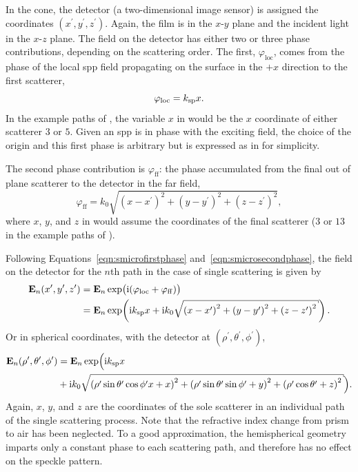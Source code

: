 In the cone, the detector (a two-dimensional image sensor) is assigned the
coordinates $(x^\prime,y^\prime,z^\prime)$.  Again, the film is in the
$x$-$y$ plane and the incident light in the $x$-$z$ plane.
The field on the detector has either two or three phase contributions,
depending on the scattering order. The first, $\varphi_\mathrm{loc}$, comes
from the phase of the local \gls{spp} field propagating on the surface in the
${+}x$ direction to the first scatterer,
\begin{equation}
  \varphi_\mathrm{loc} = k_\mathrm{sp} x.
  \label{eqn:smicrofirstphase}
\end{equation}
In the example paths of , the variable $x$ in
 would be the $x$
coordinate of either scatterer $3$ or $5$.  Given an \gls{spp} is in phase with the
exciting field, the choice of the origin and this first phase is arbitrary
but is expressed as in  for simplicity.

The second phase contribution is $\varphi_\mathrm{ff}$: the phase accumulated
from the final out of plane scatterer to the detector in the far field,
\begin{equation}
  \varphi_\mathrm{ff} =
  k_0\sqrt{{(x-x^\prime)}^2+{(y-y^\prime)}^2+{(z-z^\prime)}^2},
  \label{eqn:smicrosecondphase}
\end{equation}
where $x$, $y$, and $z$ in  would assume the coordinates of the final scatterer
($3$ or $13$ in the example paths of ).

Following Equations~\ref{eqn:smicrofirstphase} and~\ref{eqn:smicrosecondphase},
the field on the detector for the $n$th path in the case of single scattering is given by
\begin{align}
  \mathbf{E}_n(x^\prime,y^\prime,z^\prime) & =
  \mathbf{E}_n\exp\bigl(\mi(\varphi_\mathrm{loc}+\varphi_\mathrm{ff})\bigr)        \\
                                           & = \mathbf{E}_n\exp\!\left(\mi\ksp x + %
  \mi k_0\sqrt{{(x-x^\prime)}^2+{(y-y^\prime)}^2+{(z-z^\prime)}^2}\right).
  \label{eqn:smicrosinglescattering}
\end{align}
Or in spherical coordinates, with the detector at
$(\rho^\prime,\theta^\prime,\phi^\prime)$,
\begin{align}
  \mathbf{E}_n(\rho^\prime,\theta^\prime,\phi^\prime) & = \mathbf{E}_n\exp\Bigl(\mi\ksp x                            \\
                                                      & + \mi k_0\sqrt{{(\rho^\prime\sin\theta^\prime\cos\phi^\prime
      x+x)}^2+{(\rho^\prime\sin\theta^\prime\sin\phi^\prime+y)}^2+{(\rho^\prime\cos\theta^\prime+z)}^2
  } \Bigr).
  \label{eqn:scattspherical}
\end{align}
Again, $x$, $y$, and $z$ are the coordinates of the sole scatterer in an
individual path of the single scattering process.  Note that the
refractive index change from prism to air has been neglected.  To a good
approximation, the hemispherical geometry imparts only a constant phase to
each scattering path, and therefore has no effect on the speckle pattern.

